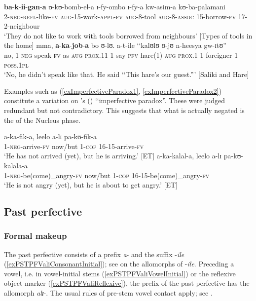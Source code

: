 \begin{exe}
\ex \label{NegPrsPfv1}\gll \textbf{ba}-\textbf{k}-\textbf{ii}-\textbf{gan}-\textbf{a} ʊ-kʊ-bomb-el-a ɪ-fy-ombo ɪ-fy-a kw-asim-a kʊ-ba-palamani\\
2-\textsc{neg}-\textsc{refl}-like-\textsc{fv} \textsc{aug}-15-work-\textsc{appl}-\textsc{fv} \textsc{aug}-8-tool \textsc{aug}-8-\textsc{assoc} 15-borrow-\textsc{fv} 17-2-neighbour\\
\glt \lq They do not like to work with tools borrowed from neighbours' [Types of tools in the home] %
\ex  \label{NegPrsPfv2}\gll mma, \textbf{a}-\textbf{ka}-\textbf{job}-\textbf{a} bo ʊ-lʊ. a-t-ile \textup{\lq\lq}kalʊlʊ ʊ-jʊ n-heesya gw-ɪtʊ\textup{''}\\
no, 1-\textsc{neg}-speak-\textsc{fv} as \textsc{aug}-\textsc{prox.11} 1-say-\textsc{pfv} \phantom{\lq\lq}hare(1) \textsc{aug}-\textsc{prox.1} 1-foreigner 1-\textsc{poss.1pl}\\
\glt \lq No, he didn't speak like that. He said \lq\lq This hare's our guest.''' [Saliki and Hare]
\end{exe}
Examples such as (\ref{exImperfectiveParadox1}, \ref{exImperfectiveParadox2}) constitute a variation on \citeauthor{DowtyD1979}'s (\citeyear{DowtyD1979}) \lq\lq imperfective paradox''. These were judged redundant but not contradictory. This suggests that what is actually negated is the  of the Nucleus phase.

\begin{exe}
\ex \label{exImperfectiveParadox1} \gll a-ka-fik-a, leelo a-lɪ pa-kʊ-fik-a\\
1-\textsc{neg}-arrive-\textsc{fv} now/but 1-\textsc{cop} 16-15-arrive-\textsc{fv}\\
\glt \lq He has not arrived (yet), but he is arriving.' [ET]
\ex \label{exImperfectiveParadox2} \gll a-ka-kalal-a, leelo a-lɪ pa-kʊ-kalala-a\\
1-\textsc{neg}-be(come)\_angry-\textsc{fv} now/but 1-\textsc{cop} 16-15-be(come)\_angry-\textsc{fv}\\
\glt \lq He is not angry (yet), but he is about to get angry.' [ET]
\end{exe}
\subsection{Past perfective}\label{PastPerfective}
\subsubsection{Formal makeup}
The past perfective consists of a prefix \textit{a}- and the suffix -\textit{ile} (\ref{exPSTPFValiConsonantInitial}); see  on the allomorphs of -\textit{ile}. Preceding a vowel, i.e. in vowel-initial stems (\ref{exPSTPFValiVowelInitial}) or the reflexive object marker (\ref{exPSTPFValiReflexive}), the prefix of the past perfective has the allomorph \textit{alɪ}-. The usual rules of pre-stem vowel contact apply; see .

